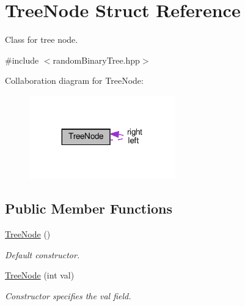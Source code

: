 \hypertarget{structTreeNode}{}\section{Tree\+Node Struct Reference}
\label{structTreeNode}


Class for tree node.  




{\ttfamily \#include $<$random\+Binary\+Tree.\+hpp$>$}



Collaboration diagram for Tree\+Node\+:
\nopagebreak
\begin{figure}[H]
\begin{center}
\leavevmode
\includegraphics[width=179pt]{structTreeNode__coll__graph}
\end{center}
\end{figure}
\subsection*{Public Member Functions}
\begin{DoxyCompactItemize}
\item 
\mbox{\label{structTreeNode_a984a98d5ccf7ef1f5a18094c6821f35d}} 
\hyperlink{structTreeNode_a984a98d5ccf7ef1f5a18094c6821f35d}{Tree\+Node} ()
\begin{DoxyCompactList}\small\item\em Default constructor. \end{DoxyCompactList}\item 
\mbox{\label{structTreeNode_a584fbc6fc6a5df73d9ab1603a5880cb0}} 
\hyperlink{structTreeNode_a584fbc6fc6a5df73d9ab1603a5880cb0}{Tree\+Node} (int val)
\begin{DoxyCompactList}\small\item\em Constructor specifies the val field. \end{DoxyCompactList}\end{DoxyCompactItemize}
